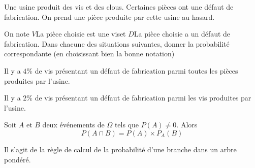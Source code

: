 \documentclass{article}
\begin{document}
\begin{example}
Une usine produit des vis et des clous. Certaines pièces ont une défaut de fabrication. On prend une pièce produite par cette usine au hasard.

On note $V$\og La pièce choisie est une vis\fg et $D$\og La pièce choisie a un défaut de fabrication\fg. Dans chacune des situations suivantes, donner la probabilité correspondante (en choisissant bien la bonne notation)

\begin{enumquestions}
\item Il y a $4\%$ de vis présentant un défaut de fabrication parmi toutes les pièces produites par l'usine.
\item Il y a $2\%$ de vis présentant un défaut de fabrication parmi les vis produites par l'usine.     
\end{enumquestions}
\vspace*{0.5cm}

\emptybox{2cm}
\end{example}

\begin{proposition}
Soit $A$ et $B$ deux événements de $\Omega$ tels que $P(A) \neq 0$. Alors 
\begin{equation*}
P(A \cap B) = P(A) \times P_A(B)
\end{equation*}
\end{proposition}

\begin{remark}
Il s'agit de la règle de calcul de la probabilité d'une branche dans un arbre pondéré.
\end{remark}
\end{document}

